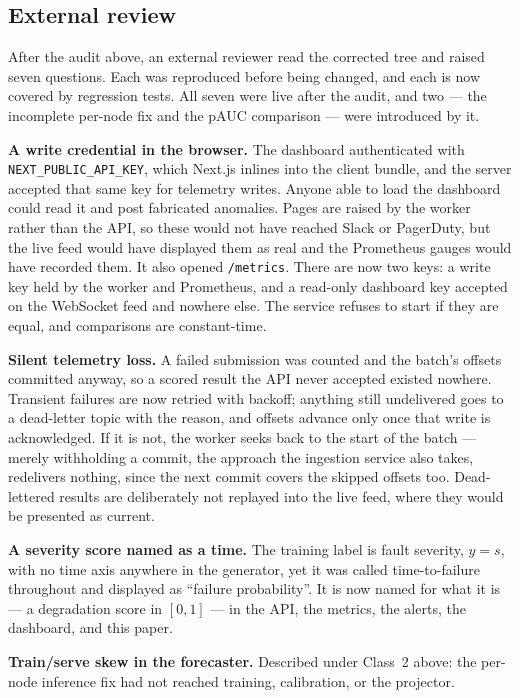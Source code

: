 \documentclass[11pt]{article}
\begin{document}
\subsection{External review}
\label{sec:review}

After the audit above, an external reviewer read the corrected tree and raised
seven questions. Each was reproduced before being changed, and each is now
covered by regression tests. All seven were live after the audit, and two ---
the incomplete per-node fix and the pAUC comparison --- were introduced by it.

\textbf{A write credential in the browser.} The dashboard authenticated with
\texttt{NEXT\_\allowbreak PUBLIC\_\allowbreak API\_\allowbreak KEY}, which Next.js inlines into the client bundle,
and the server accepted that same key for telemetry writes. Anyone able to load
the dashboard could read it and post fabricated anomalies. Pages are raised by
the worker rather than the API, so these would not have reached Slack or
PagerDuty, but the live feed would have displayed them as real and the
Prometheus gauges would have recorded them. It also opened \texttt{/metrics}.
There are now two keys: a write key held by the worker and Prometheus, and
a read-only dashboard key accepted on the WebSocket feed and nowhere else. The
service refuses to start if they are equal, and comparisons are constant-time.

\textbf{Silent telemetry loss.} A failed submission was counted and the batch's
offsets committed anyway, so a scored result the API never accepted existed
nowhere. Transient failures are now retried with backoff; anything still
undelivered goes to a dead-letter topic with the reason, and offsets advance
only once that write is acknowledged. If it is not, the worker seeks back to the
start of the batch --- merely withholding a commit, the approach the ingestion
service also takes, redelivers nothing, since the next commit covers the
skipped offsets too. Dead-lettered results are deliberately not replayed into
the live feed, where they would be presented as current.

\textbf{A severity score named as a time.} The training label is fault
severity, $y = s$, with no time axis anywhere in the generator, yet it was
called time-to-failure throughout and displayed as ``failure probability''. It
is now named for what it is --- a degradation score in $[0, 1]$ --- in the API,
the metrics, the alerts, the dashboard, and this paper.

\textbf{Train/serve skew in the forecaster.} Described under Class~2 above: the
per-node inference fix had not reached training, calibration, or the projector.
\end{document}

